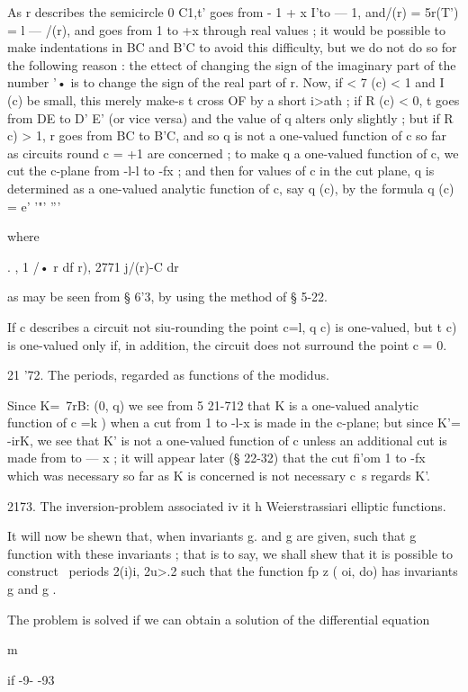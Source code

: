 As r describes the semicircle 0 C1,t' goes from - 1 + x I'to — 1,
and/(r) = 5r(T') = l — /(r), and goes from 1 to +x through real values
; it would be possible to make indentations in BC and B'C to avoid
this difficulty, but we do not do so for the following reason : the
ettect of changing the sign of the imaginary part of the number '• is
to change the sign of the real part of r. Now, if < 7 (c) < 1 and I
(c) be small, this merely make-s t cross OF by a short i>ath ; if R
(c) < 0, t goes from DE to D' E' (or vice versa) and the value of q
alters only slightly ; but if R c) > 1, r goes from BC to B'C, and so
q is not a one-valued function of c so far as circuits round c = +1
are concerned ; to make q a one-valued function of c, we cut the
c-plane from -l-l to -fx ; and then for values of c in the cut plane,
q is determined as a one-valued analytic function of c, say q (c), by
the formula q (c) = e' '"' '''

where

. , 1 /• r df r), 2771 j/(r)-C dr

as may be seen from § 6'3, by using the method of § 5-22.

If c describes a circuit not siu-rounding the point c=l, q c) is
one-valued, but t c) is one-valued only if, in addition, the circuit
does not surround the point c = 0.

21 '72. The periods, regarded as functions of the modidus.

Since K=\ 7rB: (0, q) we see from 5 21-712 that K is a one-valued
analytic function of c =k ) when a cut from 1 to -l-x is made in the
c-plane; but since K'= -irK, we see that K' is not a one-valued
function of c unless an additional cut is made from to — x ; it will
appear later (§ 22-32) that the cut fi'om 1 to -fx which was necessary
so far as K is concerned is not necessary c\ s regards K'.

2173. The inversion-problem associated iv it h Weierstrassiari
elliptic functions.

It will now be shewn that, when invariants g. and g are given, such
that g %
function with these invariants ; that is to say, we shall shew that it
is possible to construct \ periods 2(i)i, 2u>.2 such that the function
fp z ( oi, do) has invariants g and g .

The problem is solved if we can obtain a solution of the differential
equation

m

   if -9- -93

